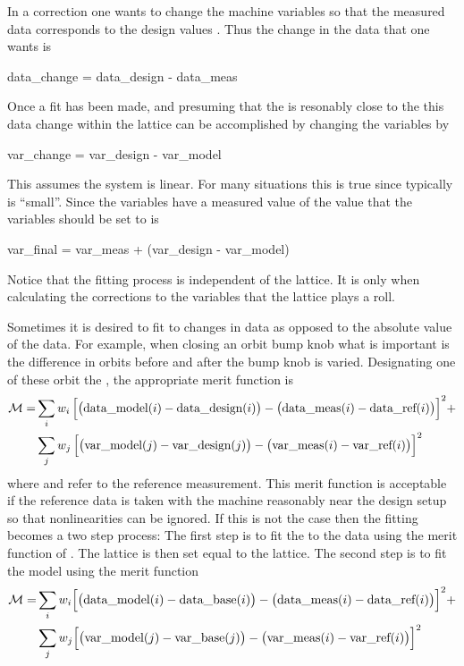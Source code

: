 In a correction one wants to change the machine variables so that the
measured data corresponds to the design values . Thus
the change in the data that one wants is
\begin{example}
  data_change = data_design - data_meas
\end{example}
Once a fit has been made, and presuming that the  is
resonably close to the  this data change within the
 lattice can be accomplished by changing the variables by
\begin{example}
  var_change = var_design - var_model
\end{example}
This assumes the system is linear. For many situations this is true
since typically  is ``small''. Since the variables have
a measured value of  the value that the variables should
be set to is
\begin{example}
  var_final = var_meas + (var_design - var_model)
\end{example}
Notice that the fitting process is independent of the 
lattice. It is only when calculating the corrections to the
variables that the  lattice plays a roll. 

Sometimes it is desired to fit to changes in data as opposed to the
absolute value of the data. For example, when closing an orbit bump
knob what is important is the difference in orbits before and after
the bump knob is varied. Designating one of these orbit the
, the appropriate merit function is
\begin{alignat}{1}
  {\cal M} = &\sum_{i} w_i \,
    \Bigl[ \bigl( {\mbox{data}}\_{\mbox{model}}(i) - {\mbox{data}}\_{\mbox{design}}(i) \bigr) - 
      \bigl( {\mbox{data}}\_{\mbox{meas}}(i) - {\mbox{data}}\_{\mbox{ref}}(i) \bigr) \Bigr]^2 + \nonumber \\
  &\sum_{j} w_j \,
    \Bigl[ \bigl( {\mbox{var}}\_{\mbox{model}}(j) - {\mbox{var}}\_{\mbox{design}}(j) \bigr) -
     \bigl( {\mbox{var}}\_{\mbox{meas}}(i) - {\mbox{var}}\_{\mbox{ref}}(i) \bigr) \Bigr]^2 
  \label{m2}
\end{alignat}
where  and  refer to the reference
measurement.  This merit function is acceptable if the reference data
is taken with the machine reasonably near the design setup so that
nonlinearities can be ignored. If this is not the case then the
fitting becomes a two step process: The first step is to fit the
 to the  data using the merit function of
. The  lattice is then set equal to the 
lattice. The second step is to fit the model using the merit function
\begin{alignat}{1}
  {\cal M} = &\sum_{i} w_i 
    \Bigl[ \bigl( {\mbox{data}}\_{\mbox{model}}(i) - {\mbox{data}}\_{\mbox{base}}(i) \bigr) - 
      \bigl( {\mbox{data}}\_{\mbox{meas}}(i) - {\mbox{data}}\_{\mbox{ref}}(i) \bigr) \Bigr]^2 + \nonumber \\
  &\sum_{j} w_j 
    \Bigl[ \bigl( {\mbox{var}}\_{\mbox{model}}(j) - {\mbox{var}}\_{\mbox{base}}(j) \bigr) -
     \bigl( {\mbox{var}}\_{\mbox{meas}}(i) - {\mbox{var}}\_{\mbox{ref}}(i) \bigr) \Bigr]^2 
  \label{m3}
\end{alignat}

